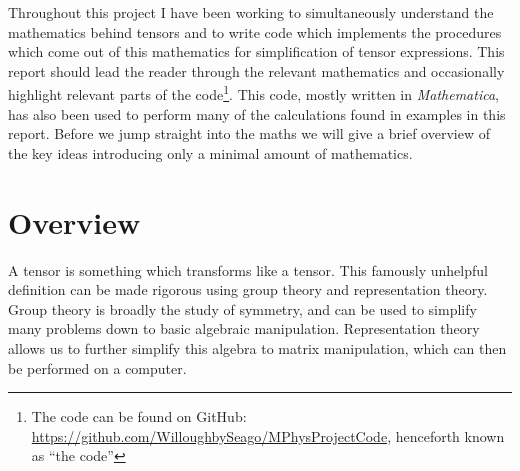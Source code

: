 \documentclass[fleqn]{NotesClass}
\newcommand{\Mathematica}{\textit{Mathematica}}
\begin{document}
    Throughout this project I have been working to simultaneously understand the mathematics behind tensors and to write code which implements the procedures which come out of this mathematics for simplification of tensor expressions.
    This report should lead the reader through the relevant mathematics and occasionally highlight relevant parts of the code\footnote{The code can be found on GitHub: \url{https://github.com/WilloughbySeago/MPhysProjectCode}, henceforth known as \enquote{the code}}.
    This code, mostly written in \Mathematica, has also been used to perform many of the calculations found in examples in this report.
    Before we jump straight into the maths we will give a brief overview of the key ideas introducing only a minimal amount of mathematics.
    
    \section{Overview}\label{sec:overview}
    A tensor is something which transforms like a tensor.
    This famously unhelpful definition can be made rigorous using group theory and representation theory.
    Group theory is broadly the study of symmetry, and can be used to simplify many problems down to basic algebraic manipulation.
    Representation theory allows us to further simplify this algebra to matrix manipulation, which can then be performed on a computer.
    
\end{document}
